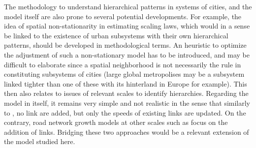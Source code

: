 \documentclass[11pt]{article}
\begin{document}


The methodology to understand hierarchical patterns in systems of cities, and the model itself are also prone to several potential developments. For example, the idea of spatial non-stationarity in estimating scaling laws, which would in a sense be linked to the existence of urban subsystems with their own hierarchical patterns, should be developed in methodological terms. An heuristic to optimize the adjustment of such a non-stationary model has to be introduced, and may be difficult to elaborate since a spatial neighborhood is not necessarily the rule in constituting subsystems of cities (large global metropolises may be a subsystem linked tighter than one of these with its hinterland in Europe for example). This then also relates to issues of relevant scales to identify hierarchies. Regarding the model in itself, it remains very simple and not realistic in the sense that similarly to \citep{xie2009topological}, no link are added, but only the speeds of existing links are updated. On the contrary, road network growth models at other scales such as \cite{raimbault2019urban} focus on the addition of links. Bridging these two approaches would be a relevant extension of the model studied here.





\end{document}
